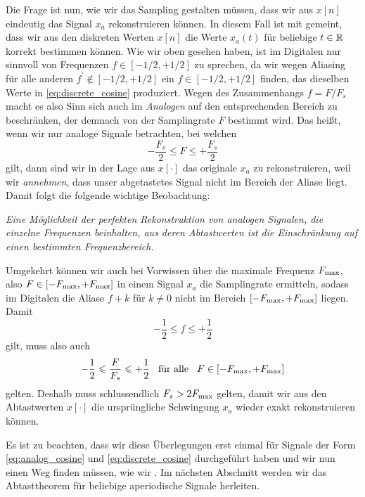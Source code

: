 Die Frage ist nun, wie wir das Sampling gestalten müssen, dass wir aus $x[n]$ eindeutig das Signal $x_a$ rekonstruieren können.
In diesem Fall ist mit  gemeint, dass wir aus den diskreten Werten $x[n]$ die Werte $x_a(t)$ für beliebige $t \in \mathbb{R}$ korrekt bestimmen können.
Wie wir oben gesehen haben, ist im Digitalen nur sinnvoll von Frequenzen $f \in [-1/2,+1/2]$ zu sprechen, da wir wegen Aliasing für alle anderen $f^\prime \notin [-1/2,+1/2]$ ein $f \in [-1/2,+1/2]$ finden, das dieselben Werte in \eqref{eq:discrete_cosine} produziert.
Wegen des Zusammenhangs $f = F/F_s$ macht es also Sinn sich auch im \emph{Analogen} auf den entsprechenden Bereich zu beschränken, der demnach von der Samplingrate $F$ bestimmt wird.
Das heißt, wenn wir nur analoge Signale betrachten, bei welchen
\[
-\frac{F_s}2 \leqslant F \leqslant +\frac{F_s}2
\]
gilt, dann sind wir in der Lage aus $x[\cdot]$ das originale $x_a$ zu rekonstruieren, weil wir \emph{annehmen}, dass unser abgetastetes Signal nicht im Bereich der Aliase liegt.
Damit folgt die folgende wichtige Beobachtung:

\emph{Eine Möglichkeit der perfekten Rekonstruktion von analogen Signalen, die einzelne Frequenzen beinhalten, aus deren Abtastwerten ist die Einschränkung auf einen bestimmten Frequenzbereich.}

Umgekehrt können wir auch bei Vorwissen über die maximale Frequenz $F_{\rm max}$, also $F \in [-F_{\rm max},+F_{\rm max}]$ in einem Signal $x_a$ die Samplingrate ermitteln, sodass im Digitalen die Aliase $f + k$ für $k \neq 0$ nicht im Bereich $[-F_{\rm max},+F_{\rm max}]$ liegen.
Damit
\[
    -\frac 12 \leqslant f \leqslant + \frac 12
\]
gilt, muss also auch
\[
    -\frac 12 \leqslant \frac{F}{F_s} \leqslant + \frac 12 {\hspace{3mm} \text{für alle} \hspace{3mm}} F \in [-F_{\rm max},+F_{\rm max}]
\]
gelten.
Deshalb muss schlussendlich $F_s > 2 F_{\rm max}$ gelten, damit wir aus den Abtastwerten $x[\cdot]$ die ursprüngliche Schwingung $x_a$ wieder exakt rekonstruieren können.

Es ist zu beachten, dass wir diese Überlegungen erst einmal  für Signale der Form \eqref{eq:analog_cosine} und \eqref{eq:discrete_cosine} durchgeführt haben und wir nun einen Weg finden müssen, wie wir .
Im nächsten Abschnitt werden wir das Abtasttheorem für beliebige aperiodische Signale herleiten.
%
%
